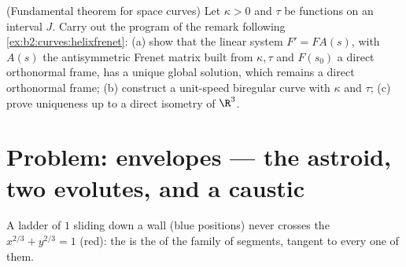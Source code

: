 \begin{exercise}[$\star\star\star$]\label{exo:b2:curves:12}
(Fundamental theorem for space curves) Let $\kappa > 0$ and
$\tau$ be  functions on an interval $J$. Carry out
the program of the remark following
\cref{ex:b2:curves:helixfrenet}: (a) show that the linear
system $F' = FA(s)$, with $A(s)$ the antisymmetric Frenet
matrix built from $\kappa, \tau$ and $F(s_0)$ a direct
orthonormal frame, has a unique global solution, which remains
a direct orthonormal frame; (b) construct a unit-speed
biregular curve with  $\kappa$ and  $\tau$;
(c) prove uniqueness up to a direct isometry of $\R^3$.
\end{exercise}

\section{Problem: envelopes --- the astroid, two evolutes, and
a caustic}

\begin{omfigure}

{\small A ladder of  $1$ sliding down a wall (blue
positions) never crosses the  $x^{2/3} + y^{2/3} = 1$
(red): the  is the \emph{} of the family of
segments, tangent to every one of them.}
\end{omfigure}

